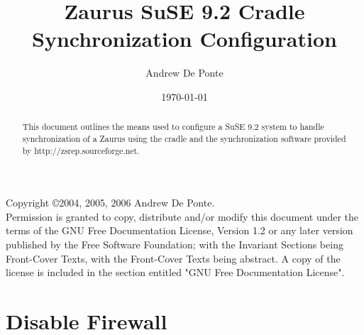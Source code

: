 \documentclass{article}
\title{Zaurus SuSE 9.2 Cradle Synchronization Configuration}
\author{Andrew De Ponte}
\date{\today}
\begin{document}
\maketitle

\newpage

\begin{abstract}
This document outlines the means used to configure a SuSE 9.2 system
to handle synchronization of a Zaurus using the cradle and the synchronization
software provided by http://zsrep.sourceforge.net.
\end{abstract}

\newpage

\noindent Copyright \copyright 2004, 2005, 2006 Andrew De Ponte.\\
Permission is granted to copy, distribute and/or modify this document under
the terms of the GNU Free Documentation License, Version 1.2 or any later
version published by the Free Software Foundation; with the Invariant
Sections being Front-Cover Texts, with the Front-Cover  Texts being
abstract. A copy of the license is included in the section entitled "GNU
Free Documentation License".

\newpage

\tableofcontents

\newpage

\section{Disable Firewall}
\end{document}
